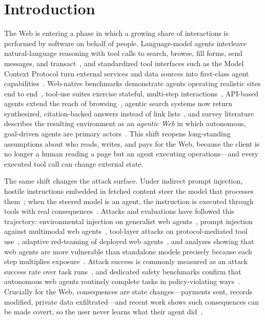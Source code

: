 \section{Introduction}

The Web is entering a phase in which a growing share of interactions is performed by software on behalf of people. Language-model agents interleave natural-language reasoning with tool calls to search, browse, fill forms, send messages, and transact~\cite{yao2022react,schick2023toolformer}, and standardized tool interfaces such as the Model Context Protocol turn external services and data sources into first-class agent capabilities~\cite{hou2025model,zhang2025security}. Web-native benchmarks demonstrate agents operating realistic sites end to end~\cite{zhou2023webarena,deng2023mindweb}, tool-use suites exercise stateful, multi-step interactions~\cite{liu2023agentbench,lu2024toolsandbox}, API-based agents extend the reach of browsing~\cite{song2024beyond}, agentic search systems now return synthesized, citation-backed answers instead of link lists~\cite{gou2025mindweb}, and survey literature describes the resulting environment as an \emph{agentic Web} in which autonomous, goal-driven agents are primary actors~\cite{yang2025agentic,nie2026synergy,zhang2024large}. This shift reopens long-standing assumptions about who reads, writes, and pays for the Web, because the client is no longer a human reading a page but an agent executing operations---and every executed tool call can change external state.

The same shift changes the attack surface. Under indirect prompt injection, hostile instructions embedded in fetched content steer the model that processes them~\cite{greshake2023what,liu2023prompt,liu2024automatic}; when the steered model is an agent, the instruction is executed through tools with real consequences~\cite{zhan2024injecagent,debenedetti2024agentdojo,zhang2024agent}. Attacks and evaluations have followed this trajectory: environmental injection on generalist web agents~\cite{liao2024environmental}, prompt injection against multimodal web agents~\cite{wang2025webinject}, tool-layer attacks on protocol-mediated tool use~\cite{wang2026adaptools}, adaptive red-teaming of deployed web agents~\cite{syros2026muzzle}, and analyses showing that web agents are more vulnerable than standalone models precisely because each step multiplies exposure~\cite{chiang2025agents}. Attack success is commonly measured as an attack success rate over task runs~\cite{debenedetti2024agentdojo,zhan2024injecagent}, and dedicated safety benchmarks confirm that autonomous web agents routinely complete tasks in policy-violating ways~\cite{tur2025safearena,levy2024stwebagentbench}. Crucially for the Web, consequences are state changes---payments sent, records modified, private data exfiltrated---and recent work shows such consequences can be made covert, so the user never learns what their agent did~\cite{lee2026will}.

